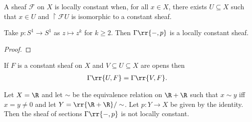 \documentclass{article}
\begin{document}
\begin{definition}
  \missingdef
\end{definition}

\begin{definition}
  A sheaf $\mathcal F$ on $X$ is locally constant
  when, for all $x\in X$, there exists $U\subseteq X$ such that $x\in U$ and
  $\restriction{\mathcal F}{U}$ is isomorphic to a constant sheaf.
\end{definition}

\begin{example}
  Take $p:S^1 \to S^1$ as $z\mapsto z^k$ for $k\geq 2$.
  Then $\Gamma\rr{-,p}$ is a locally constant sheaf.
  \begin{proof}
    \missingproof
  \end{proof}
\end{example}

\begin{lemma}
  If $F$ is a constant sheaf on $X$ and $V\subseteq U\subseteq X$ are opens then
  \begin{align*}
    \Gamma\rr{U, F} = \Gamma\rr{V,F}.
  \end{align*}
\end{lemma}

\begin{example}
  Let $X=\R$ and let $\sim$ be the equivalence relation on $\R+\R$ such that
  $x\sim y$ iff $x=y\neq 0$ and let $Y=\rr{\R+\R}/\sim$. Let $p:Y\to X$ be
  given by the identity. Then the sheaf of sections $\Gamma\rr{-,p}$
  is not locally constant.
\end{example}
\end{document}
